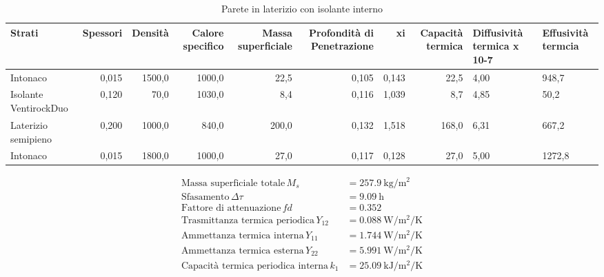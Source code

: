 \begin{table}
\centering
\caption{Parete in laterizio con isolante interno}
\begin{tabular}{lrrrrrrr}
\toprule
                Strati & Spessori & Densità & Calore specifico & Massa superficiale & Profondità di Penetrazione &     xi & Capacità termica & Diffusività termica x 10-7 & Effusività termcia \\
\midrule
              Intonaco &    0,015 &  1500,0 &           1000,0 &               22,5 &                      0,105 &  0,143 &             22,5 &                       4,00 &              948,7 \\
 Isolante VentirockDuo &    0,120 &    70,0 &           1030,0 &                8,4 &                      0,116 &  1,039 &              8,7 &                       4,85 &               50,2 \\
   Laterizio semipieno &    0,200 &  1000,0 &            840,0 &              200,0 &                      0,132 &  1,518 &            168,0 &                       6,31 &              667,2 \\
              Intonaco &    0,015 &  1800,0 &           1000,0 &               27,0 &                      0,117 &  0,128 &             27,0 &                       5,00 &             1272,8 \\
\bottomrule
\end{tabular}
\end{table}

\begin{flushleft}
\begin{align*}
\text{Massa superficiale totale} \, M_s &= \SI{257.9}{\kilo\gram\per\metre\squared}\\
\text{Sfasamento} \, \Delta\tau &= \SI{9.09}{\hour}\\
\text{Fattore di attenuazione} \, fd &= \SI{0.352}{}\\
\text{Trasmittanza termica periodica} \, Y_{12} &= \SI{0.088}{\watt\per\metre\squared\per\kelvin}\\
\text{Ammettanza termica interna} \, Y_{11} &= \SI{1.744}{\watt\per\metre\squared\per\kelvin}\\
\text{Ammettanza termica esterna} \, Y_{22} &= \SI{5.991}{\watt\per\metre\squared\per\kelvin}\\
\text{Capacità termica periodica interna} \, k_1 &= \SI{25.09}{\kilo\joule\per\metre\squared\per\kelvin}\\
\end{align*}
\end{flushleft}
